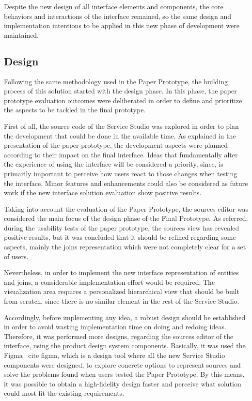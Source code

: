 Despite the new design of all interface elements and components, the core behaviors and interactions of the interface remained, so the same design and implementation intentions to be applied in this new phase of development were maintained.

\subsection{Design}
\label{subsec:service_studio_design}

Following the same methodology used in the Paper Prototype, the building process of this solution started with the design phase. In this phase, the paper prototype evaluation outcomes were deliberated in order to define and prioritize the aspects to be tackled in the final prototype.

First of all, the source code of the Service Studio was explored in order to plan the development that could be done in the available time. As explained in the presentation of the paper prototype, the development aspects were planned according to their impact on the final interface. Ideas that fundamentally alter the experience of using the interface will be considered a priority, since, is primarily important to perceive how users react to those changes when testing the interface. Minor features and enhancements could also be considered as future work if the new interface solution evaluation show positive results.

Taking into account the evaluation of the Paper Prototype, the sources editor was considered the main focus of the design phase of the Final Prototype. As referred, during the usability tests of the paper prototype, the sources view has revealed positive results, but it was concluded that it should be refined regarding some aspects, mainly the joins representation which were not completely clear for a set of users.

Nevertheless, in order to implement the new interface representation of entities and joins, a considerable implementation effort would be required. The visualization area requires a personalized hierarchical view that should be built from scratch, since there is no similar element in the rest of the Service Studio.

Accordingly, before implementing any idea, a robust design should be established in order to avoid wasting implementation time on doing and redoing ideas. Therefore, it was performed more designs, regarding the sources editor of the interface, using the product design system components. Basically, it was used the Figma \ cite {figma}, which is a design tool where all the new Service Studio components were designed, to explore concrete options to represent sources and solve the problems found when users tested the Paper Prototype. By this means, it was possible to obtain a high-fidelity design faster and perceive what solution could most fit the existing requirements.

